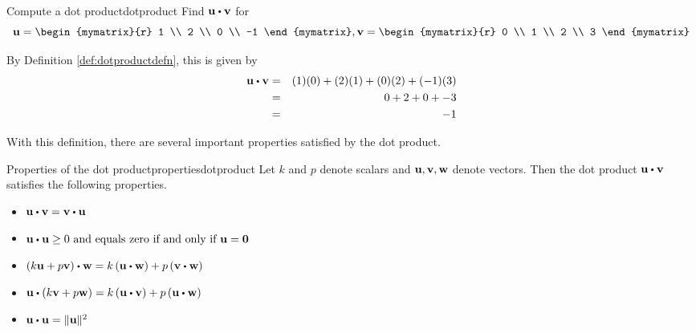 \begin{example}{Compute a dot product}{dotproduct}
Find $\vect{u} \dotprod \vect{v}$ for
\begin{equation*}
\vect{u}
=
\begin{mymatrix}{r}
1 \\
2 \\
0 \\
-1 
\end{mymatrix},
\vect{v}
=
\begin{mymatrix}{r}
0 \\
1 \\
2 \\
3
\end{mymatrix} 
\end{equation*}
\end{example}

\begin{solution}
By Definition \ref{def:dotproductdefn}, this is given by 
\begin{eqnarray*}
\vect{u} \dotprod \vect{v}
&=&
(1)(0) + (2)(1) + (0)(2) + (-1)(3) \\
&=&
0 + 2 + 0 + -3 \\
&=&
-1
\end{eqnarray*}
\end{solution}

With this definition, there are several important properties satisfied
by the dot product.

\begin{proposition}{Properties of the dot product}{propertiesdotproduct}
Let $k $ and $p $  denote scalars and ${\bf u},{\bf v},{\bf w}$ denote vectors.
Then the dot product $\vect{u} \dotprod \vect{v}$ satisfies the following properties.
\begin{itemize}
\item
$\vect{u}\dotprod \vect{v}= \vect{v}\dotprod \vect{u} $
\item
$\vect{u}\dotprod \vect{u}\geq 0 \text{ and equals zero if and only if }\vect{u}=\vect{0}$
\item
$\tup{k\vect{u}+p\vect{v}} \dotprod \vect{w}=k\tup{\vect{u}\dotprod \vect{w}} +p\tup{\vect{v}\dotprod \vect{w}}$
\item
$\vect{u}\dotprod\tup{k\vect{v}+p\vect{w}} =k\tup{
\vect{u}\dotprod \vect{v}} +p\tup{\vect{u}\dotprod \vect{w}}$
\item
$\vect{u}\dotprod \vect{u}=\vectlength \vect{u}\vectlength ^{2} $
\end{itemize}
\end{proposition}

